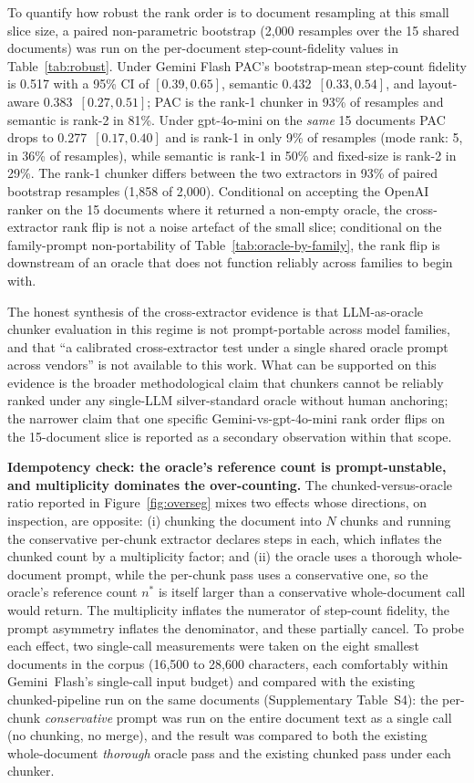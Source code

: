 \documentclass[make,article,submit,oneauthor,pdftex]{Definitions/mdpi}
\begin{document}
To quantify how robust the rank order is to document resampling at
this small slice size, a paired non-parametric bootstrap (2{,}000
resamples over the 15 shared documents) was run on the per-document
step-count-fidelity values in Table~\ref{tab:robust}. Under Gemini
Flash PAC's bootstrap-mean step-count fidelity is 0.517 with a 95\%
CI of $[0.39, 0.65]$, semantic 0.432~$[0.33, 0.54]$, and layout-aware
0.383~$[0.27, 0.51]$; PAC is the rank-1 chunker in 93\% of resamples
and semantic is rank-2 in 81\%. Under gpt-4o-mini on the \emph{same}
15 documents PAC drops to 0.277~$[0.17, 0.40]$ and is rank-1 in only
9\% of resamples (mode rank: 5, in 36\% of resamples), while semantic
is rank-1 in 50\% and fixed-size is rank-2 in 29\%. The rank-1
chunker differs between the two extractors in 93\% of paired
bootstrap resamples (1{,}858 of 2{,}000). Conditional on accepting
the OpenAI ranker on the 15 documents where it returned a non-empty
oracle, the cross-extractor rank flip is not a noise artefact of the
small slice; conditional on the family-prompt non-portability of
Table~\ref{tab:oracle-by-family}, the rank flip is downstream of an
oracle that does not function reliably across families to begin with.

The honest synthesis of the cross-extractor evidence is that LLM-as-oracle
chunker evaluation in this regime is not prompt-portable across
model families, and that ``a calibrated cross-extractor test under
a single shared oracle prompt across vendors'' is not available to
this work. What can be supported on this evidence is the broader
methodological claim that chunkers cannot be reliably ranked under
any single-LLM silver-standard oracle without human anchoring; the
narrower claim that one specific Gemini-vs-gpt-4o-mini rank order
flips on the 15-document slice is reported as a secondary
observation within that scope.

\vspace{4pt}
\noindent\textbf{Idempotency check: the oracle's reference count is
prompt-unstable, and multiplicity dominates the over-counting.} The
chunked-versus-oracle ratio reported in Figure~\ref{fig:overseg} mixes
two effects whose directions, on inspection, are opposite: (i)
chunking the document into $N$ chunks and running the conservative
per-chunk extractor declares steps in each, which inflates the
chunked count by a multiplicity factor; and (ii) the oracle uses a
thorough whole-document prompt, while the per-chunk pass uses a
conservative one, so the oracle's reference count $n^{*}$ is itself
larger than a conservative whole-document call would return. The
multiplicity inflates the numerator of step-count fidelity, the
prompt asymmetry inflates the denominator, and these partially cancel.
To probe each effect, two single-call measurements were taken on the
eight smallest documents in the corpus (16{,}500 to 28{,}600
characters, each comfortably within Gemini~Flash's single-call input
budget) and compared with the existing chunked-pipeline run on the
same documents (Supplementary Table~S4): the per-chunk
\emph{conservative} prompt was run on the entire document text as a
single call (no chunking, no merge), and the result was compared to
both the existing whole-document \emph{thorough} oracle pass and the
existing chunked pass under each chunker.
\end{document}
